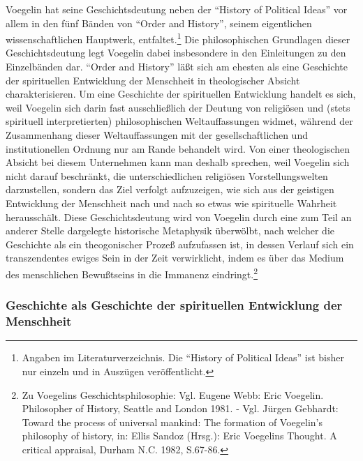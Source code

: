 Voegelin hat seine Geschichtsdeutung neben der "`History of Political
Ideas"' vor allem in den fünf Bänden von "`Order and History"', seinem
eigentlichen wissenschaftlichen Hauptwerk, entfaltet.\footnote{Angaben
  im Literaturverzeichnis. Die "`History of Political Ideas"' ist
  bisher nur einzeln und in Auszügen veröffentlicht.} Die
philosophischen Grundlagen dieser Geschichtsdeutung legt Voegelin
dabei insbesondere in den Einleitungen zu den Einzelbänden dar.
"`Order and History"' läßt sich am ehesten als eine Geschichte der
spirituellen Entwicklung der Menschheit in theologischer Absicht
charakterisieren. Um eine Geschichte der spirituellen Entwicklung
handelt es sich, weil Voegelin sich darin fast ausschließlich der
Deutung von religiösen und (stets spirituell interpretierten)
philosophischen Weltauf\/fassungen widmet, während der Zusammenhang
dieser Weltauf\/fassungen mit der gesellschaftlichen und
institutionellen Ordnung nur am Rande behandelt wird.  Von einer
theologischen Absicht bei diesem Unternehmen kann man deshalb
sprechen, weil Voegelin sich nicht darauf beschränkt, die
unterschiedlichen religiösen Vorstellungswelten darzustellen, sondern
das Ziel verfolgt aufzuzeigen, wie sich aus der geistigen Entwicklung
der Menschheit nach und nach so etwas wie spirituelle Wahrheit
herausschält. Diese Geschichtsdeutung wird von Voegelin durch eine zum
Teil an anderer Stelle dargelegte historische Metaphysik überwölbt,
nach welcher die Geschichte als ein theogonischer Prozeß aufzufassen
ist, in dessen Verlauf sich ein transzendentes ewiges Sein in der Zeit
verwirklicht, indem es über das Medium des menschlichen Bewußtseins in
die Immanenz eindringt.\footnote{Zu Voegelins Geschichtsphilosophie:
  Vgl.  Eugene Webb: Eric Voegelin. Philosopher of History, Seattle
  and London 1981.  - Vgl.  Jürgen Gebhardt: Toward the process of
  universal mankind: The formation of Voegelin's philosophy of
  history, in: Ellis Sandoz (Hrsg.): Eric Voegelins Thought. A
  critical appraisal, Durham N.C. 1982, S.67-86.}

\subsubsection{Geschichte als Geschichte der spirituellen Entwicklung der Menschheit}

